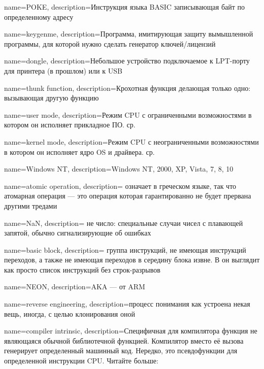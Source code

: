 {
  name=POKE,
  description={Инструкция языка BASIC записывающая байт по определенному адресу}
}

{
  name=keygenme,
  description={Программа, имитирующая защиту вымышленной программы, для которой нужно сделать 
  генератор ключей/лицензий}
} %

{
  name=dongle,
  description={Небольшое устройство подключаемое к LPT-порту для принтера (в прошлом) или к USB}
}

{
  name=thunk function,
  description={Крохотная функция делающая только одно: вызывающая другую функцию}
}

{
  name=user mode,
  description={Режим CPU с ограниченными возможностями в котором он исполняет прикладное ПО. ср.}
}

{
  name=kernel mode,
  description={Режим CPU с неограниченными возможностями в котором он исполняет ядро OS и драйвера. ср.}
}

{
  name=Windows NT,
  description={Windows NT, 2000, XP, Vista, 7, 8, 10}
}

{
  name=atomic operation,
  description={
  означает  в греческом языке, так что атомарная операция ---
  это операция которая гарантированно не будет прервана другими тредами}
}

{
  name=NaN,
  description={
  	не число: специальные случаи чисел с плавающей запятой, 
  	обычно сигнализирующие об ошибках
  }
}

{
  name=basic block,
  description={
  	группа инструкций, не имеющая инструкций переходов,
	а также не имеющая переходов в середину блока извне.
	В \IDA он выглядит как просто список инструкций без строк-разрывов
  }
}

{
  name=NEON,
  description={\ac{AKA}  --- от ARM}
}

{
  name=reverse engineering,
  description={процесс понимания как устроена некая вещь, иногда, с целью клонирования оной}
}

{
  name=compiler intrinsic,
  description={Специфичная для компилятора функция не являющаяся обычной библиотечной функцией.
	Компилятор вместо её вызова генерирует определенный машинный код.
	Нередко, это псевдофункции для определенной инструкции \ac{CPU}. Читайте больше:}
}

